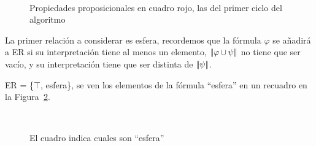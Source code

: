 \begin{figure}[ht]
\begin{center}
\\[0pt]
\caption{Propiedades proposicionales en cuadro rojo, las del primer ciclo del algoritmo}
\label{fig-modelo2}
\end{center}
\end{figure}

%

La primer relaci\'on a considerar es \textsf{esfera}, recordemos que la f\'ormula $\varphi$ se a\~nadir\'a a ER si su interpretaci\'on tiene al menos un elemento, $|\!|\varphi \cup \psi|\!|$ no tiene que ser vac\'io, y su interpretaci\'on tiene que ser distinta de $|\!|\psi|\!|$. 

ER = \{$\top$, \textsf{esfera}\}, se ven los elementos de la f\'ormula ``esfera'' en un recuadro en la Figura~\ref{fig-modelo3}.

\begin{figure}[ht]
\begin{center}
\\[0pt]
\caption{El cuadro indica cuales son ``esfera''}
\label{fig-modelo3}
\end{center}
\end{figure}

